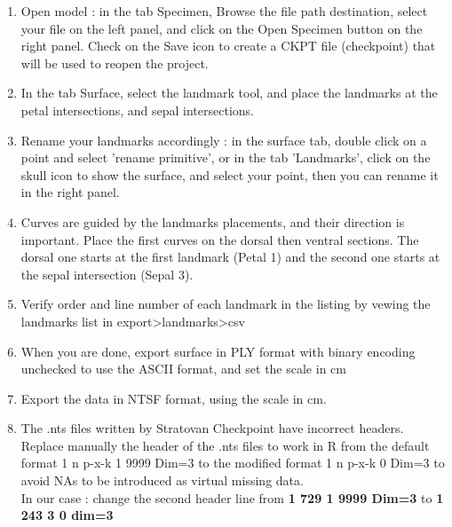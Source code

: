 \documentclass[10pt,letter,english]{article}
\begin{document}
\begin{enumerate}
    \item Open model : in the tab Specimen, Browse the file path destination, select your file on the left panel, and click on the Open Specimen button on the right panel. Check on the Save icon to create a CKPT file (checkpoint) that will be used to reopen the project.
    \item In the tab Surface, select the landmark tool, and place the landmarks at the petal intersections, and sepal intersections.
    \item Rename your landmarks accordingly : in the surface tab, double click on a point and select 'rename primitive', or in the tab 'Landmarks', click on the skull icon to show the surface, and select your point, then you can rename it in the right panel.
    \item Curves are guided by the landmarks placements, and their direction is important. Place the first curves on the dorsal then ventral sections. The dorsal one starts at the first landmark (Petal 1) and the second one starts at the sepal intersection (Sepal 3).
    \item Verify order and line number of each landmark in the listing by vewing the landmarks list in export>landmarks>csv
    \item When you are done, export surface in PLY format with binary encoding unchecked to use the ASCII format, and set the scale in cm
    \item Export the data in NTSF format, using the scale in cm.
    \item The .nts files written by Stratovan Checkpoint have incorrect headers. Replace manually the header of the .nts files to work in R from the default format 1 n p-x-k 1 9999 Dim=3 to the modified format 1 n p-x-k 0 Dim=3 to avoid NAs to be introduced as virtual missing data. \\ In our case : change the second header line from \textbf{1 729 1 9999 Dim=3} to \textbf{1 243 3 0 dim=3} 
\end{enumerate}
\end{document}
